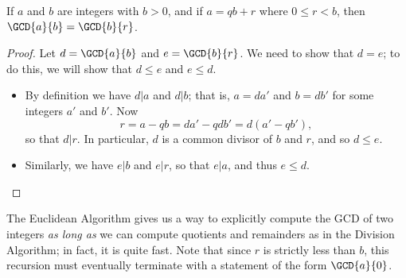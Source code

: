 \documentclass{article}
\begin{document}
\begin{prop}
If $a$ and $b$ are integers with $b > 0$, and if $a = qb + r$ where $0 \leq r < b$, then $\GCD{a}{b} = \GCD{b}{r}$.
\end{prop}

\begin{proof}
Let $d = \GCD{a}{b}$ and $e = \GCD{b}{r}$. We need to show that $d = e$; to do this, we will show that $d \leq e$ and $e \leq d$.
\begin{itemize}
\item By definition we have $d|a$ and $d|b$; that is, $a = da'$ and $b = db'$ for some integers $a'$ and $b'$. Now \[ r = a - qb = da' - qdb' = d(a' - qb'), \] so that $d|r$. In particular, $d$ is a common divisor of $b$ and $r$, and so $d \leq e$.
\item Similarly, we have $e|b$ and $e|r$, so that $e|a$, and thus $e \leq d$. \qedhere
\end{itemize}
\end{proof}

The Euclidean Algorithm gives us a way to explicitly compute the GCD of two integers \emph{as long as} we can compute quotients and remainders as in the Division Algorithm; in fact, it is quite fast. Note that since $r$ is strictly less than $b$, this recursion must eventually terminate with a statement of the form $\GCD{a}{0}$.
\end{document}
